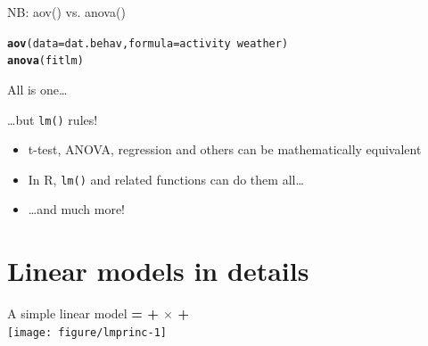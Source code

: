 \documentclass[10pt]{beamer}\usepackage[]{graphicx}\usepackage[]{color}
\makeatletter
\newcommand{\hlopt}[1]{\textcolor[rgb]{0,0,0}{#1}}%
\newcommand{\hlstd}[1]{\textcolor[rgb]{0.345,0.345,0.345}{#1}}%
\newcommand{\hlkwc}[1]{\textcolor[rgb]{0.333,0.667,0.333}{#1}}%
\newcommand{\hlkwd}[1]{\textcolor[rgb]{0.737,0.353,0.396}{\textbf{#1}}}%
\newenvironment{kframe}{%
 \def\at@end@of@kframe{}%
 \ifinner\ifhmode%
  \def\at@end@of@kframe{\end{minipage}}%
  \begin{minipage}{\columnwidth}%
 \fi\fi%
 \def\FrameCommand##1{\hskip\@totalleftmargin \hskip-\fboxsep
 \colorbox{shadecolor}{##1}\hskip-\fboxsep
     \hskip-\linewidth \hskip-\@totalleftmargin \hskip\columnwidth}%
 \MakeFramed {\advance\hsize-\width
   \@totalleftmargin\z@ \linewidth\hsize
   \@setminipage}}%
 {\par\unskip\endMakeFramed%
 \at@end@of@kframe}
\newenvironment{knitrout}{}{} %
\makeatother
\begin{document}
\begin{frame}[fragile]{NB: aov() vs. anova()}

\begin{knitrout}
\color{fgcolor}\begin{kframe}
\begin{alltt}
\hlkwd{aov}\hlstd{(}\hlkwc{data} \hlstd{= dat.behav,} \hlkwc{formula} \hlstd{= activity} \hlopt{~} \hlstd{weather)}
\hlkwd{anova}\hlstd{(fitlm)}
\end{alltt}
\end{kframe}
\end{knitrout}

\end{frame}

\begin{frame}{All is one\dots}
\pause
  \begin{block}{\dots but \texttt{lm()} rules!}
    \begin{itemize}
      \item t-test, ANOVA, regression and others can be mathematically equivalent
      \item In R, \texttt{lm()} and related functions can do them all\dots
      \item \dots and much more!
    \end{itemize}
  \end{block}
\end{frame}

\section{Linear models in details}

\begin{frame}[fragile]{A simple linear model}
  \textbf{{\color{purple}{Response}} = {\color{blue}{Intercept}} + {\color{red}{Slope}} $\times$ {\color{orange}{Predictor}} + {\color{gray}{Error}}} \\
  
\begin{knitrout}
\color{fgcolor}
\texttt{[image: figure/lmprinc-1]} 

\end{knitrout}
\end{frame}
\end{document}
